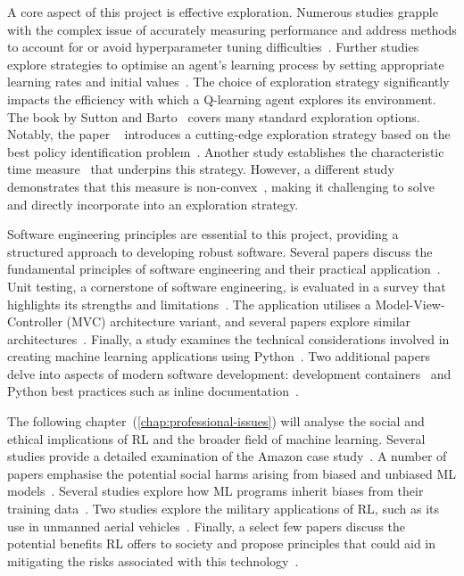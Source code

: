 \documentclass[]{final_report}
\begin{document}
A core aspect of this project is effective exploration. Numerous studies grapple with the complex issue of accurately measuring performance and address methods to account for or avoid hyperparameter tuning difficulties~\cite{assessingDeepRL, evaluatingRL, parameterFreeExploration}. Further studies explore strategies to optimise an agent's learning process by setting appropriate learning rates and initial values~\cite{even2003learning, deathTransfer,decayingLearningRates}. The choice of exploration strategy significantly impacts the efficiency with which a Q-learning agent explores its environment. The book by Sutton and Barto~\cite{sutton2018reinforcement} covers many standard exploration options. Notably, the paper ~\cite{modelFree} introduces a cutting-edge exploration strategy based on the best policy identification problem~\cite{bestPolicyIdentifaction}. Another study establishes the characteristic time measure~\cite{characteristicTime} that underpins this strategy. However, a different study demonstrates that this measure is non-convex~\cite{characteristicTimeNonConvex}, making it challenging to solve and directly incorporate into an exploration strategy.

Software engineering principles are essential to this project, providing a structured approach to developing robust software. Several papers discuss the fundamental principles of software engineering and their practical application~\cite{softwareEngineringPrinciples,van2008software}. Unit testing, a cornerstone of software engineering, is evaluated in a survey that highlights its strengths and limitations~\cite{unitTestingSurvey}. The application utilises a Model-View-Controller (MVC) architecture variant, and several papers explore similar architectures~\cite{webMVC, mvvm, gamesMVC}. Finally, a study examines the technical considerations involved in creating machine learning applications using Python~\cite{pythonMachineLearning}. Two additional papers delve into aspects of modern software development: development containers~\cite{developmentContainers} and Python best practices such as inline documentation~\cite{pythonAutoDoc}.

The following chapter~(\ref{chap:professional-issues}) will analyse the social and ethical implications of RL and the broader field of machine learning. Several studies provide a detailed examination of the Amazon  case study~\cite{facialRecognitionBias, legislatingRekognition, legislatingOG, rekognitionOverview}. A number of papers emphasise the potential social harms arising from biased and unbiased ML models~\cite{AISocialImpactAndAccountability,facialRecognitionBias, anprAccountability}. Several studies explore how ML programs inherit biases from their training data~\cite{LLMSocialEthicalRisks, AISocialImpactAndAccountability, facialRecognitionBias}. Two studies explore the military applications of RL, such as its use in unmanned aerial vehicles~\cite{rlMilitaryReviewChina, DRLDrones}. Finally, a select few papers discuss the potential benefits RL offers to society and propose principles that could aid in mitigating the risks associated with this technology~\cite{AIRisksAndPrinciples,deepRLsocietalImpact, ransbotham2017reshaping}.
\end{document}
